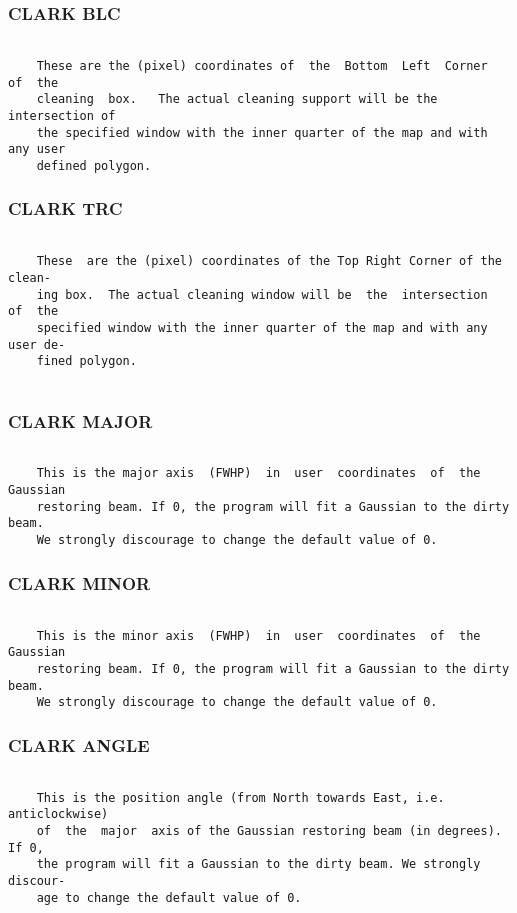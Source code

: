 \subsubsection{CLARK BLC}
\begin{verbatim}

    These are the (pixel) coordinates of  the  Bottom  Left  Corner  of  the
    cleaning  box.   The actual cleaning support will be the intersection of
    the specified window with the inner quarter of the map and with any user
    defined polygon.

\end{verbatim}
\subsubsection{CLARK TRC}
\begin{verbatim}

    These  are the (pixel) coordinates of the Top Right Corner of the clean-
    ing box.  The actual cleaning window will be  the  intersection  of  the
    specified window with the inner quarter of the map and with any user de-
    fined polygon.


\end{verbatim}
\subsubsection{CLARK MAJOR}
\begin{verbatim}

    This is the major axis  (FWHP)  in  user  coordinates  of  the  Gaussian
    restoring beam. If 0, the program will fit a Gaussian to the dirty beam.
    We strongly discourage to change the default value of 0.

\end{verbatim}
\subsubsection{CLARK MINOR}
\begin{verbatim}

    This is the minor axis  (FWHP)  in  user  coordinates  of  the  Gaussian
    restoring beam. If 0, the program will fit a Gaussian to the dirty beam.
    We strongly discourage to change the default value of 0.

\end{verbatim}
\subsubsection{CLARK ANGLE}
\begin{verbatim}

    This is the position angle (from North towards East, i.e. anticlockwise)
    of  the  major  axis of the Gaussian restoring beam (in degrees).  If 0,
    the program will fit a Gaussian to the dirty beam. We strongly  discour-
    age to change the default value of 0.

\end{verbatim}
